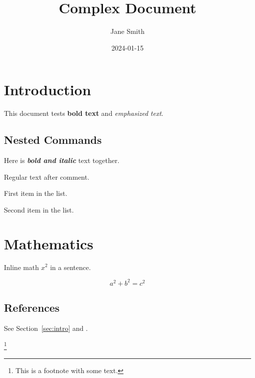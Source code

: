 \documentclass{article}
\title{Complex Document}
\author{Jane Smith}
\date{2024-01-15}
\begin{document}
\section{Introduction}
This document tests \textbf{bold text} and \emph{emphasized text}.

\subsection{Nested Commands}
Here is \textbf{\emph{bold and italic}} text together.

Regular text after comment.

\begin{itemize}
First item in the list.

Second item in the list.
\end{itemize}

\section{Mathematics}
Inline math $x^2$ in a sentence.

\begin{equation}
a^2 + b^2 = c^2
\end{equation}

\subsection{References}
See Section~\ref{sec:intro} and \cite{knuth1984}.

\footnote{This is a footnote with some text.}
\end{document}
